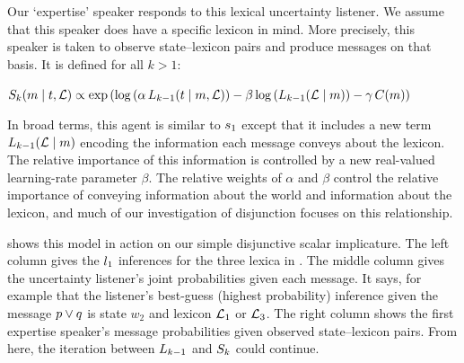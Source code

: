 \documentclass{article}
\begin{document}
Our `expertise' speaker responds to this lexical uncertainty listener.
We assume that this speaker does have a specific lexicon in mind.  More
precisely, this speaker is taken to observe state--lexicon pairs and
produce messages on that basis. It is defined for all $k > 1$:

\begin{examples}  
  \item\label{Sk}%
    $\SpeakerK(\msg \given \state, \Lex) \propto 
    \exp
    \left(
      \log
      \left(\alpha\,\ListenerK[k-1](\state \given \msg, \Lex)\right)
      - 
      \beta \log\left(\ListenerK[k-1](\Lex\given\msg)\right)
      -
      \gamma\,\Costs(\msg)
    \right)$
\end{examples}
%
In broad terms, this agent is similar to $\speakerOne$ except that it
includes a new term $\ListenerK[k-1](\Lex\given\msg)$ encoding the
information each message conveys about the lexicon. The relative
importance of this information is controlled by a new real-valued
learning-rate parameter $\beta$. The relative weights of $\alpha$ and
$\beta$ control the relative importance of conveying information about
the world and information about the lexicon, and much of our
investigation of disjunction focuses on this relationship.

 shows this model in action on our simple
disjunctive scalar implicature. The left column gives the
$\listenerOne$ inferences for the three lexica in
. The middle column gives the uncertainty
listener's joint probabilities given each message. It says, for
example that the listener's best-guess (highest probability) inference
given the message $\porq$ is state $w_{2}$ and lexicon $\Lex_{1}$ or
$\Lex_{3}$. The right column shows the first expertise speaker's
message probabilities given observed state--lexicon pairs. From here,
the iteration between $\ListenerK[k-1]$ and $\SpeakerK$ could continue.

\end{document}
